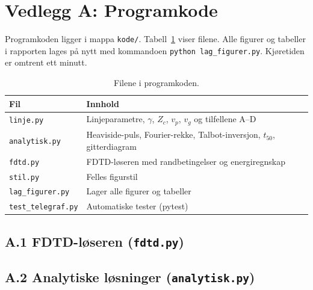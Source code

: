 \documentclass[11pt,a4paper]{article}
\numberwithin{equation}{section}
\numberwithin{figure}{section}
\numberwithin{table}{section}
\begin{document}
\clearpage
\section*{Vedlegg A: Programkode}\label{app:kode}
\setcounter{table}{0}
\renewcommand{\thetable}{A.\arabic{table}}

Programkoden ligger i mappa \texttt{kode/}. Tabell~\ref{tab:filer} viser filene.
Alle figurer og tabeller i rapporten lages på nytt med kommandoen
\texttt{python lag\_figurer.py}. Kjøretiden er omtrent ett minutt.

\begin{table}[H]
  \centering
  \caption{Filene i programkoden.}
  \label{tab:filer}
  \begin{tabular}{ll}
    \toprule
    Fil & Innhold \\
    \midrule
    \texttt{linje.py}        & Linjeparametre, $\gamma$, $Z_c$, $v_p$, $v_g$ og tilfellene A--D \\
    \texttt{analytisk.py}    & Heaviside-puls, Fourier-rekke, Talbot-inversjon, $t_{50}$, gitterdiagram \\
    \texttt{fdtd.py}         & FDTD-løseren med randbetingelser og energiregnskap \\
    \texttt{stil.py}         & Felles figurstil \\
    \texttt{lag\_figurer.py} & Lager alle figurer og tabeller \\
    \texttt{test\_telegraf.py} & Automatiske tester (pytest) \\
    \bottomrule
  \end{tabular}
\end{table}

\subsection*{A.1 \quad FDTD-løseren (\texttt{fdtd.py})}


\subsection*{A.2 \quad Analytiske løsninger (\texttt{analytisk.py})}

\end{document}
